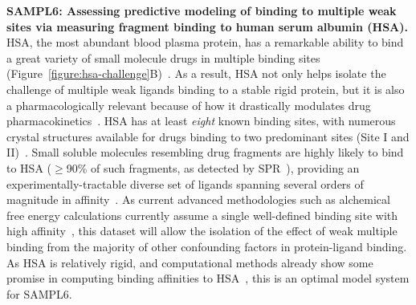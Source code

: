 \documentclass[11pt]{article}
\begin{document}
\textbf{SAMPL6: Assessing predictive modeling of binding to multiple weak sites via measuring fragment binding to human serum albumin (HSA).}
HSA, the most abundant blood plasma protein, has a remarkable ability to bind a great variety of small molecule drugs in multiple binding sites (Figure~\ref{figure:hsa-challenge}B)~\cite{Fasano:2005:IUBMBLife(InternationalUnionofBiochemistryandMolecularBiology:Life)}.
As a result, HSA not only helps isolate the challenge of multiple weak ligands binding to a stable rigid protein, but it is also a pharmacologically relevant because of how it drastically modulates drug pharmacokinetics~\cite{Hall:2013:JournalofChemicalInformationandModeling}.
HSA has at least \emph{eight} known binding sites, with numerous crystal structures available for drugs binding to two predominant sites (Site I and II)~\cite{Hall:2013:JournalofChemicalInformationandModeling}.
Small soluble molecules resembling drug fragments are highly likely to bind to HSA ($\ge$90\% of such fragments, as detected by SPR~\cite{Elinder:2011:JournalofBiomolecularScreening}), providing an experimentally-tractable diverse set of ligands spanning several orders of magnitude in affinity~\cite{Elinder:2011:JournalofBiomolecularScreening}.
As current advanced methodologies such as alchemical free energy calculations currently assume a single well-defined binding site with high affinity~\cite{Gilson:1997:BiophysicalJournal}, this dataset will allow the isolation of the effect of weak multiple binding from the majority of other confounding factors in protein-ligand binding.
As HSA is relatively rigid, and computational methods already show some promise in computing binding affinities to HSA~\cite{Hall:2013:JournalofChemicalInformationandModeling,Lexa:2014:PLoSONE,Evoli:2016:bioRxiv}, this is an optimal model system for SAMPL6.
\end{document}
